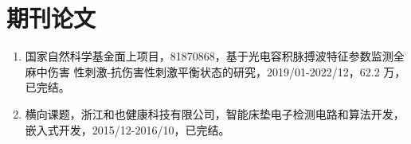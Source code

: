 {    \section*{期刊论文}
    \begin{enumerate}
        \item 国家自然科学基金面上项目，81870868，基于光电容积脉搏波特征参数监测全麻中伤害
        性刺激-抗伤害性刺激平衡状态的研究，2019/01-2022/12，62.2 万，已完结。
        \item 横向课题，浙江和也健康科技有限公司，智能床垫电子检测电路和算法开发，嵌入式开发，2015/12-2016/10，已完结。
    \end{enumerate}
}